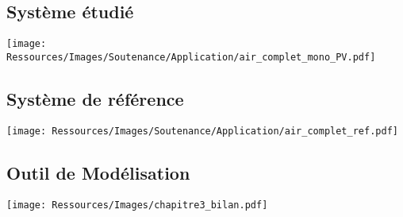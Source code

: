 \documentclass[xcolor=x11names, compress, 11pt]{beamer}
\begin{document}
\subsection{Système étudié}
\begin{frame}[c]
    \vfill
    \centering
    \texttt{[image: Ressources/Images/Soutenance/Application/air\_complet\_mono\_PV.pdf]}
    \vfill
\end{frame}

\subsection{Système de référence}
\begin{frame}[c]
    \vfill
    \centering
    \texttt{[image: Ressources/Images/Soutenance/Application/air\_complet\_ref.pdf]}
    \vfill
\end{frame}


\subsection{Outil de Modélisation}
\begin{frame}[t]
    \vfill
    \centering
    \texttt{[image: Ressources/Images/chapitre3\_bilan.pdf]}
    \vfill
\end{frame}
\end{document}
